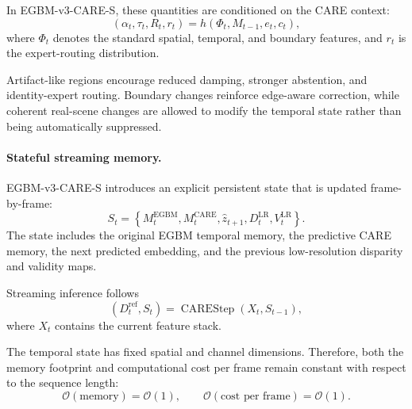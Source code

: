 \documentclass[11pt,a4paper]{article}
\begin{document}
In EGBM-v3-CARE-S, these quantities are conditioned on the CARE context:
\begin{equation}
    \left(
        \alpha_t,
        \tau_t,
        R_t,
        r_t
    \right)
    =
    h
    \left(
        \Phi_t,
        M_{t-1},
        e_t,
        c_t
    \right),
\end{equation}
where $\Phi_t$ denotes the standard spatial, temporal, and boundary features, and
$r_t$ is the expert-routing distribution.

Artifact-like regions encourage reduced damping, stronger abstention, and
identity-expert routing. Boundary changes reinforce edge-aware correction, while
coherent real-scene changes are allowed to modify the temporal state rather than
being automatically suppressed.

\paragraph{Stateful streaming memory.}
EGBM-v3-CARE-S introduces an explicit persistent state that is updated
frame-by-frame:
\begin{equation}
    S_t =
    \left\{
        M_t^{\mathrm{EGBM}},
        M_t^{\mathrm{CARE}},
        \hat{z}_{t+1},
        D_t^{\mathrm{LR}},
        V_t^{\mathrm{LR}}
    \right\}.
\end{equation}
The state includes the original EGBM temporal memory, the predictive CARE
memory, the next predicted embedding, and the previous low-resolution disparity
and validity maps.

Streaming inference follows
\begin{equation}
    \left(
        D_t^{\mathrm{ref}},
        S_t
    \right)
    =
    \operatorname{CAREStep}
    \left(
        X_t,
        S_{t-1}
    \right),
\end{equation}
where $X_t$ contains the current feature stack.

The temporal state has fixed spatial and channel dimensions. Therefore, both the
memory footprint and computational cost per frame remain constant with respect
to the sequence length:
\begin{equation}
    \mathcal{O}(\text{memory}) = \mathcal{O}(1),
    \qquad
    \mathcal{O}(\text{cost per frame}) = \mathcal{O}(1).
\end{equation}
\end{document}
